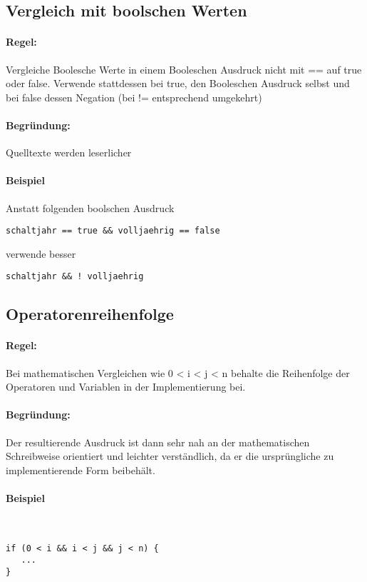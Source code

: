 \subsection{Vergleich mit boolschen Werten}

\paragraph{Regel:} Vergleiche Boolesche Werte in einem Booleschen Ausdruck nicht mit == auf true oder false. Verwende stattdessen bei true, den Booleschen Ausdruck selbst und bei false dessen Negation (bei != entsprechend umgekehrt)
\paragraph{Begründung:} Quelltexte werden leserlicher


\paragraph{Beispiel}
Anstatt folgenden boolschen Ausdruck\par
\begin{lstlisting}
schaltjahr == true && volljaehrig == false
\end{lstlisting}

verwende besser

\begin{lstlisting}
schaltjahr && ! volljaehrig
\end{lstlisting}

\subsection{Operatorenreihenfolge}

\paragraph{Regel:} Bei mathematischen Vergleichen wie 0 < i < j < n behalte die Reihenfolge der Operatoren und Variablen in der Implementierung bei.
\paragraph{Begründung:} Der resultierende Ausdruck ist dann sehr nah an der mathematischen Schreibweise orientiert und leichter verständlich, da er die ursprüngliche zu implementierende Form beibehält.

\paragraph{Beispiel} \hspace{0pt}\\
\begin{lstlisting}
if (0 < i && i < j && j < n) {
   ...
}
\end{lstlisting}


